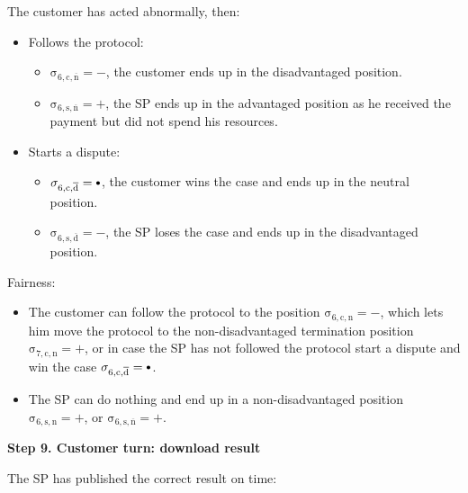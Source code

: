 \documentclass{ieeeaccess}
\newcommand\sbullet[1][.75]{\mathbin{\ThisStyle{\vcenter{\hbox{%
  \scalebox{#1}{$\SavedStyle\bullet$}}}}}%
}
\begin{document}
The customer has acted abnormally, then:

\begin{itemize}
\item
  Follows the protocol:

  \begin{itemize}
  
  \item
    \(\operatorname{\sigma_{6, c, \overline{n}} = -}\), the customer ends up in the disadvantaged position.
  \item
    \(\operatorname{\sigma_{6, s, \overline{n}} = +}\), the SP ends up in the advantaged position as he received the payment but did not spend his resources.
  \end{itemize}
\item
  Starts a dispute:

  \begin{itemize}
  
  \item
    \(\operatorname{\sigma_{6, c, \overline{d}} = \sbullet}\), the customer wins the case and ends up in the neutral position.
  \item
    \(\operatorname{\sigma_{6, s, \overline{d}} = -}\), the SP loses the case and ends up in the disadvantaged position.
  \end{itemize}
\end{itemize}

Fairness:

\begin{itemize}

\item
  The customer can follow the protocol to the position \(\operatorname{\sigma_{6, c, n} = -}\), which lets him move the protocol to the non-disadvantaged termination position \(\operatorname{\sigma_{7, c, n} = +}\), or in case the SP has not followed the protocol start a dispute and win the case \(\operatorname{\sigma_{6, c, \overline{d}} = \sbullet}\).
\item
  The SP can do nothing and end up in a non-disadvantaged position \(\operatorname{\sigma_{6, s, n} = +}\), or \(\operatorname{\sigma_{6, s, \overline{n}} = +}\).
\end{itemize}

\noindent \textbf
{Step 9. Customer turn: download result}\label{step-9-retrieval-of-results}

The SP has published the correct result on time:
\end{document}
